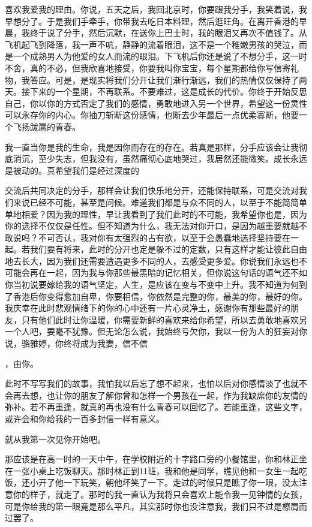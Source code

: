 \documentclass{article}
\begin{document}
\newpage 

喜欢我爱我的理由。你说，五天之后，我回北京时，你要跟我分手，我笑着说，我早想分了。于是我们手牵手，你带我去吃日本料理，然后逛旺角。在离开香港的早晨，我终于说了分手，然后沉默，在送你上巴士时，我的眼泪又再次不值钱了。从飞机起飞到降落，我一声不吭，静静的流着眼泪，这不是一个稚嫩男孩的哭泣，而是一个成熟男人为他爱的女人而流的眼泪。下飞机后你还是说了不想分手，这一时不舍，真的不必，但我欣喜地接受，你要我叫你宝宝，每个星期都给你写信寄礼物，我答应。可是，是现实将我们分开让我们渐行渐远，我们的热情仅仅保持了两天。接下来的一个星期，不再联系。不要难过，这是成长的代价。你终于开始反思自己，你以你的方式否定了我们的感情，勇敢地进入另一个世界，希望这一份灵性可以永存你的内心。你抽刀斩断这份感情，也断去少年最后一点优柔寡断，他要一个飞扬跋扈的青春。

我一直当你是我的生命，我是因你而存在的存在。若真是那样，分手应该会让我彻底消沉，至少失志，但我没有，虽然痛彻心底地哭过，我居然还能微笑。成长永远是被动的。真希望我们是经过深度的

\newpage 

交流后共同决定的分手，那样会让我们快乐地分开，还能保持联系，可是交流对我们来说已经不可能，甚至是问候。难道我们都是与众不同的人，以至于不能简简单单地相爱？因为我的理性，早让我看到了我们此时的不可能，我希望你也是，因为你的选择不仅仅是任性。但不知道为什么，我无法对你开口，是因为越重要就越不敢说吗？不可否认，我对你有太强烈的占有欲，以至于会愚蠢地选择坚持要在一起。若我们要有将来，此时的分开也定是躲不过的定数，只有这样才能让彼此自由地去长大，因为我们还需要遭遇更多不同的人，去感受更多爱。你说我们永远也不可能会再在一起，因为我与你那些最黑暗的记忆相关，但你说这句话的语气还不如你当初说要嫁给我的语气坚定，人生，是应该在变与不变中上升。我不知道为何到了香港后你变得愈加自卑，你要相信，你依然是完整的你，最美的你，最好的你。我庆幸在此时悲观情绪下的你的心中还有一片心灵净土，感谢你有那些最好的朋友，只有他们此时让你温暖，你需要新鲜的喜欢来给你希望，所以去勇敢地喜欢另一个人吧，要毫不犹豫。但无论怎么说，我始终亏欠你，我以一份为人的狂妄对你说，骆雅婷，你终将成为我妻，信不信

\newpage 

，由你。

此时不写写我们的故事，我怕我以后忘了想不起来，也怕以后对你感情淡了也就不会再去想，也让你的朋友了解你曾和怎样一个男孩在一起，作为我缺席你的友情的弥补。若不再重逢，就真的再也没有什么青春可以回忆了。若能重逢，这些文字，或许会和你给我的一百多封信一样有意义。

就从我第一次见你开始吧。

那应该是在高一时的一天中午，在学校附近的十字路口旁的小餐馆里，你和林正坐在一张小桌上吃饭聊天。那时林正到11班，我和他是同学，瞧见他和一女生一起吃饭，还小开了他一下玩笑，朝他坏笑了一下。走过的时候只是瞧了你一眼，没太注意你的样子，就走了。那时的我一直认为我将只会喜欢上能令我一见钟情的女孩，可是你给我的第一眼竟是那么平凡，其实那时你也没注意我，我们只不过是檫肩而过罢了。
\end{document}
